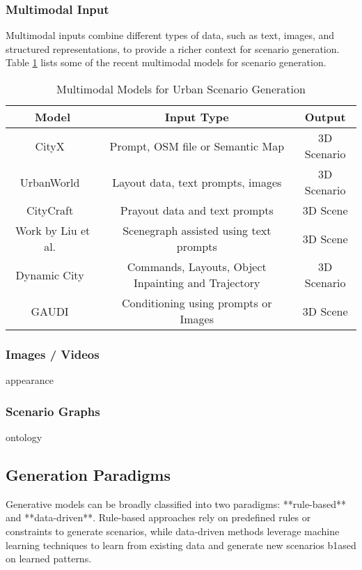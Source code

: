 \documentclass{article}
\begin{document}
\subsubsection{Multimodal Input}

Multimodal inputs combine different types of data, such as text, images, and structured representations, to provide a richer context for scenario generation. Table \ref{tab:multimodal_models} lists some of the recent multimodal models for scenario generation.

\begin{table}[ht]
\centering
    \begin{tabular}{|c|c|c|}
    \hline
    \textbf{Model} & \textbf{Input Type} & \textbf{Output} \\ \hline
    CityX~\cite{zhang2024cityx} & Prompt, OSM file or Semantic Map & 3D Scenario \\ \hline
    UrbanWorld~\cite{shang2024urbanworld} & Layout data, text prompts, images & 3D Scenario \\ \hline
    CityCraft~\cite{deng2024citycraft} & Prayout data and text prompts & 3D Scene \\ \hline
    Work by Liu et al.~\cite{liu2025controllable} & Scenegraph assisted using text prompts & 3D Scene \\ \hline
    Dynamic City~\cite{bian2024dynamiccity} & Commands, Layouts, Object Inpainting and Trajectory & 3D Scenario \\ \hline
    GAUDI~\cite{bautista2022gaudi} & Conditioning using prompts or Images & 3D Scene \\ \hline
    \end{tabular}
\caption{Multimodal Models for Urban Scenario Generation}
\label{tab:multimodal_models}


\subsubsection{Images / Videos}
appearance

\subsubsection{Scenario Graphs}
ontology

\subsection{Generation Paradigms}

Generative models can be broadly classified into two paradigms: **rule-based** and **data-driven**. Rule-based approaches rely on predefined rules or constraints to generate scenarios, while data-driven methods leverage machine learning techniques to learn from existing data and generate new scenarios b1ased on learned patterns.


\end{table}
\end{document}

